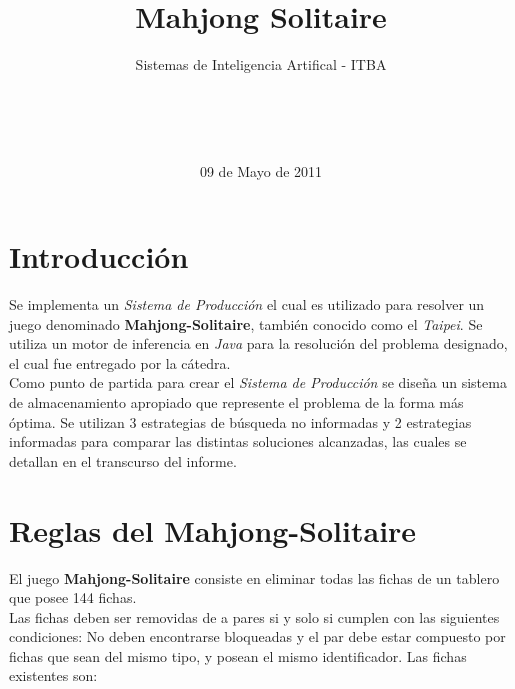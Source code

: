 \documentclass{sig-alternate}
\begin{document}

\title{Mahjong Solitaire}
\subtitle{Sistemas de Inteligencia Artifical - ITBA}


\author{
	\\
	\\
	\\
}

\date{09 de Mayo de 2011}

\maketitle

\section*{Introducci\'on}
	Se implementa un \textit{Sistema de Producci\'on} el cual es utilizado para resolver un juego denominado \textbf{Mahjong-Solitaire}, tambi\'en conocido como el \textit{Taipei}. Se utiliza un motor de inferencia en \textit{Java} para la resoluci\'on del problema designado, el cual fue entregado por la c\'atedra. \\
	Como punto de partida para crear el \textit{Sistema de Producci\'on} se dise\~{n}a un sistema de almacenamiento apropiado que represente el problema de la forma m\'as \'optima. Se utilizan 3 estrategias de b\'usqueda no informadas y 2 estrategias informadas para comparar las distintas soluciones alcanzadas, las cuales se detallan en el transcurso del informe.

\section*{Reglas del Mahjong-Solitaire}
	El juego \textbf{Mahjong-Solitaire} consiste en eliminar todas las fichas de un tablero que posee 144 fichas. \\
	Las fichas deben ser removidas de a pares si y solo si cumplen con las siguientes condiciones: No deben encontrarse bloqueadas y el par debe estar compuesto por fichas que sean del mismo tipo, y posean el mismo identificador. Las fichas existentes son:
\end{document}
